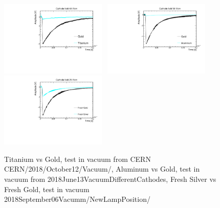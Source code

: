 \documentclass[a4paper,11pt]{article}
\begin{document}
\begin{figure}[tb]
	\begin{center}
	\includegraphics[width=0.45\textwidth]{figures/TitaniumVSGold_40Vcm.pdf}			   \, \includegraphics[width=0.45\textwidth]{figures/AluminumVSGold_50Vcm.pdf}	\\
	\includegraphics[width=0.45\textwidth]{figures/FirstSilverVSGold_25Vcm.pdf} \,	
	\caption{Titanium vs Gold, test in vacuum from CERN 
	CERN/2018/October12/Vacuum/, 
	Aluminum vs Gold, test in vacuum from 2018June13VacuumDifferentCathodes,
Fresh Silver vs Fresh Gold, test in vacuum  
	2018September06Vacumm/NewLampPosition/
	}
	\label{fig:VacuumPhotocathodes}
	\end{center}
\end{figure}

\end{document}
